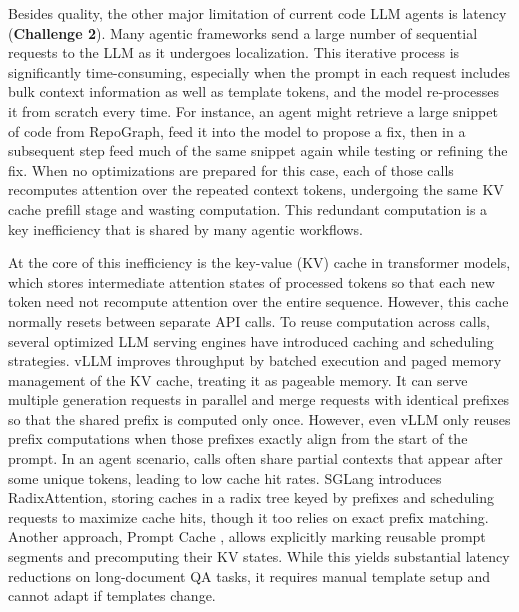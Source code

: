 Besides quality, the other major limitation of current code LLM agents is latency (\textbf{Challenge 2}). Many agentic frameworks send a large number of sequential requests to the LLM as it undergoes localization. This iterative process is significantly time-consuming, especially when the prompt in each request includes bulk context information as well as template tokens, and the model re-processes it from scratch every time. For instance, an agent might retrieve a large snippet of code from RepoGraph, feed it into the model to propose a fix, then in a subsequent step feed much of the same snippet again while testing or refining the fix. When no optimizations are prepared for this case, each of those calls recomputes attention over the repeated context tokens, undergoing the same KV cache prefill stage and wasting computation. This redundant computation is a key inefficiency that is shared by many agentic workflows.

At the core of this inefficiency is the key-value (KV) cache in transformer models, which stores intermediate attention states of processed tokens so that each new token need not recompute attention over the entire sequence. However, this cache normally resets between separate API calls. To reuse computation across calls, several optimized LLM serving engines have introduced caching and scheduling strategies. vLLM \cite{kwon2023vllm} improves throughput by batched execution and paged memory management of the KV cache, treating it as pageable memory. It can serve multiple generation requests in parallel and merge requests with identical prefixes so that the shared prefix is computed only once. However, even vLLM only reuses prefix computations when those prefixes exactly align from the start of the prompt. In an agent scenario, calls often share partial contexts that appear after some unique tokens, leading to low cache hit rates. SGLang \cite{zheng2024sglangefficientexecutionstructured} introduces RadixAttention, storing caches in a radix tree keyed by prefixes and scheduling requests to maximize cache hits, though it too relies on exact prefix matching. Another approach, Prompt Cache \cite{gim2024promptcachemodularattention}, allows explicitly marking reusable prompt segments and precomputing their KV states. While this yields substantial latency reductions on long-document QA tasks, it requires manual template setup and cannot adapt if templates change.

